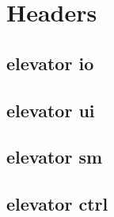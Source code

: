 \documentclass[a4paper]{article}
\begin{document}
\section{Headers}
\subsection{elevator io}

\subsection{elevator ui}

\subsection{elevator sm}

\subsection{elevator ctrl}
 
\end{document}
